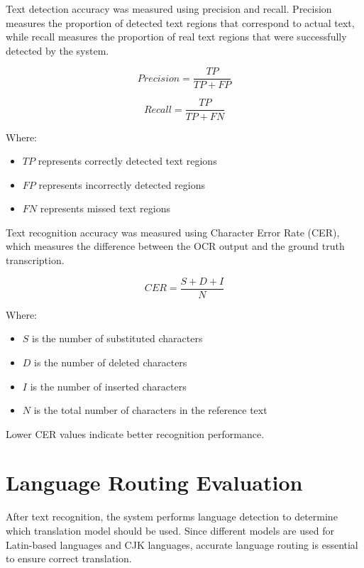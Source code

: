 Text detection accuracy was measured using precision and recall. Precision measures the proportion of detected text regions that correspond to actual text, while recall measures the proportion of real text regions that were successfully detected by the system.

\begin{equation}
Precision = \frac{TP}{TP + FP}
\end{equation}

\begin{equation}
Recall = \frac{TP}{TP + FN}
\end{equation}

Where:
\begin{itemize}
\item $TP$ represents correctly detected text regions
\item $FP$ represents incorrectly detected regions
\item $FN$ represents missed text regions
\end{itemize}

Text recognition accuracy was measured using Character Error Rate (CER), which measures the difference between the OCR output and the ground truth transcription.

\begin{equation}
CER = \frac{S + D + I}{N}
\end{equation}

Where:
\begin{itemize}
\item $S$ is the number of substituted characters
\item $D$ is the number of deleted characters
\item $I$ is the number of inserted characters
\item $N$ is the total number of characters in the reference text
\end{itemize}

Lower CER values indicate better recognition performance.

\section{Language Routing Evaluation}

After text recognition, the system performs language detection to determine which translation model should be used. Since different models are used for Latin-based languages and CJK languages, accurate language routing is essential to ensure correct translation.

